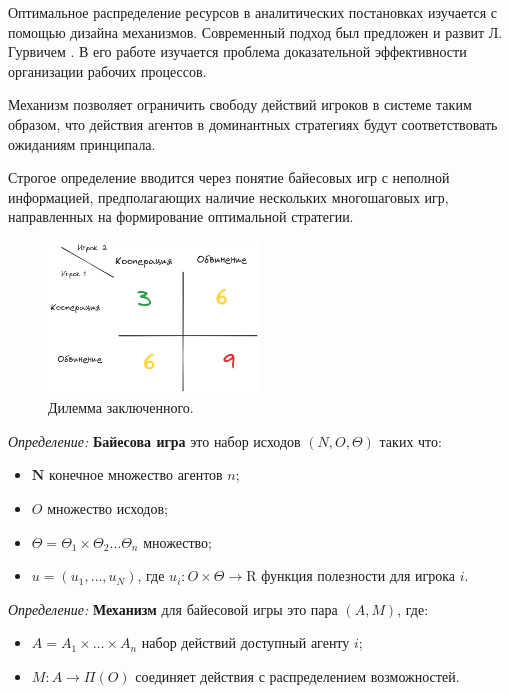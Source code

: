 Оптимальное распределение ресурсов в аналитических постановках изучается с помощью дизайна механизмов.
Современный подход был предложен и развит Л. Гурвичем \cite{hurwicz1960optimality}.
В его работе изучается проблема доказательной эффективности организации рабочих процессов.

Механизм позволяет ограничить свободу действий игроков в системе таким образом, 
что действия агентов в доминантных стратегиях будут соответствовать ожиданиям принципала.

Строгое определение вводится через понятие байесовых игр с неполной информацией, 
предполагающих наличие нескольких многошаговых игр, направленных на формирование оптимальной стратегии. 

\begin{figure}[h]
    \centering
    \includegraphics[width=0.5\textwidth]{assets/pedagogic/social/dilemma.excalidraw.png}
    \caption{Дилемма заключенного.}
    \label{dilemma}
\end{figure}


\textit{Определение:} \textbf{Байесова игра} это набор исходов $(N,O,\Theta)$ таких что:
\begin{itemize}
    \item $\mathbf{N}$ конечное множество агентов $n$;
    \item $O$ множество исходов;
    \item  $\Theta = \Theta_1 \times \Theta_2 \dots \Theta_n $ множество; 
    \item $u = (u_1, \dots, u_N)$, где $u_i: O \times \Theta \rightarrow \mathrm{R}$  функция полезности для игрока $i$.
\end{itemize}

\textit{Определение:} \textbf{Механизм} для байесовой игры это пара $(A,M)$, где: 
\begin{itemize}
    \item $A = A_1 \times \dots \times A_n$ набор действий доступный агенту $i$;
    \item $M: A \rightarrow \Pi(O)$ соединяет действия с распределением возможностей.
\end{itemize}

